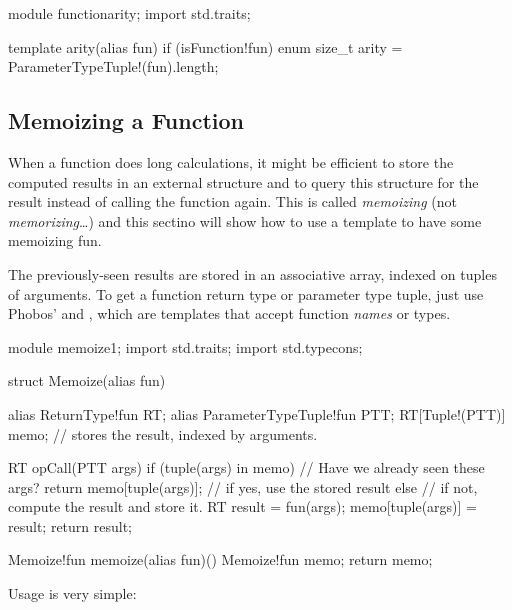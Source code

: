 
\begin{dcode}
module functionarity;
import std.traits;

template arity(alias fun) 
if (isFunction!fun)
{
    enum size_t arity = ParameterTypeTuple!(fun).length;
}
\end{dcode}

\subsection{Memoizing a Function} \label{memoizing}

When a function does long calculations, it might be efficient to store the computed results in an external structure and to query this structure for the result instead of calling the function again. This is called \emph{memoizing} (not \emph{memorizing}\ldots) and this sectino will show how to use a template to have some memoizing fun.

The previously-seen results are stored in an associative array, indexed on tuples of arguments. To get a function return type or parameter type tuple, just use Phobos'  and , which are templates that accept function \emph{names} or types.

\begin{dcode}
module memoize1;
import std.traits;
import std.typecons;

struct Memoize(alias fun)
{
    alias ReturnType!fun RT;
    alias ParameterTypeTuple!fun PTT;
    RT[Tuple!(PTT)] memo; // stores the result, indexed by arguments.

    RT opCall(PTT args)
    {
        if (tuple(args) in memo)      // Have we already seen these args?
        {
            return memo[tuple(args)]; // if yes, use the stored result
        }
        else // if not, compute the result and store it.
        {
            RT result = fun(args);
            memo[tuple(args)] = result;
            return result;
        }
    }
}

Memoize!fun memoize(alias fun)()
{
    Memoize!fun memo;
    return memo;
}
\end{dcode}

Usage is very simple:

